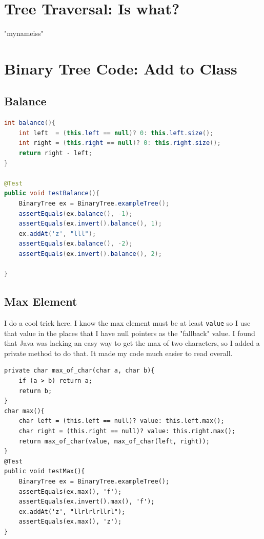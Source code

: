 \documentclass[twoside=false,DIV=14]{scrartcl}
\begin{document}
\section{Tree Traversal: Is what?}

"mynameiss"

\section{Binary Tree Code: Add to Class}
\subsection{Balance}
\begin{lstlisting}[language=java]
int balance(){
    int left  = (this.left == null)? 0: this.left.size();
    int right = (this.right == null)? 0: this.right.size();
    return right - left;
}

@Test
public void testBalance(){
    BinaryTree ex = BinaryTree.exampleTree();
    assertEquals(ex.balance(), -1);
    assertEquals(ex.invert().balance(), 1);
    ex.addAt('z', "lll");
    assertEquals(ex.balance(), -2);
    assertEquals(ex.invert().balance(), 2);

}
\end{lstlisting}

\subsection{Max Element}
I do a cool trick here.  I know the max element must be at least \verb+value+ so I use that value in the places that I have null pointers as the "fallback" value.  I found that Java was lacking an easy way to get the max of two characters, so I added a private method to do that.  It made my code much easier to read overall.
\begin{lstlisting}
private char max_of_char(char a, char b){
    if (a > b) return a;
    return b;
}
char max(){
    char left = (this.left == null)? value: this.left.max();
    char right = (this.right == null)? value: this.right.max();
    return max_of_char(value, max_of_char(left, right));
}
@Test
public void testMax(){
    BinaryTree ex = BinaryTree.exampleTree();
    assertEquals(ex.max(), 'f');
    assertEquals(ex.invert().max(), 'f');
    ex.addAt('z', "llrlrlrllrl");
    assertEquals(ex.max(), 'z');
}    
\end{lstlisting}
\end{document}
